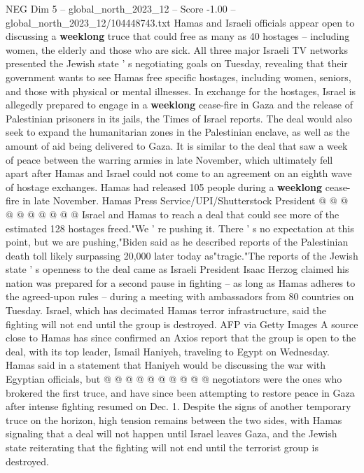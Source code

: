 \begin{textsample}{NEG Dim 5 – global\_north\_2023\_12 – Score -1.00 – global\_north\_2023\_12/104448743.txt}  \label{ex:f5_neg_053}
Hamas and Israeli officials appear open to discussing a \textbf{weeklong} truce that could free as many as 40 hostages -- including women, the elderly and those who are sick.
All three major Israeli TV networks presented the Jewish state ' s negotiating goals on Tuesday, revealing that their government wants to see Hamas free specific hostages, including women, seniors, and those with physical or mental illnesses.
In exchange for the hostages, Israel is allegedly prepared to engage in a \textbf{weeklong} cease-fire in Gaza and the release of Palestinian prisoners in its jails, the Times of Israel reports.
The deal would also seek to expand the humanitarian zones in the Palestinian enclave, as well as the amount of aid being delivered to Gaza.
It is similar to the deal that saw a week of peace between the warring armies in late November, which ultimately fell apart after Hamas and Israel could not come to an agreement on an eighth wave of hostage exchanges.
Hamas had released 105 people during a \textbf{weeklong} cease-fire in late November.
Hamas Press Service/UPI/Shutterstock President @ @ @ @ @ @ @ @ @ @ Israel and Hamas to reach a deal that could see more of the estimated 128 hostages freed."We ' re pushing it.
There ' s no expectation at this point, but we are pushing,"Biden said as he described reports of the Palestinian death toll likely surpassing 20,000 later today as"tragic."The reports of the Jewish state ' s openness to the deal came as Israeli President Isaac Herzog claimed his nation was prepared for a second pause in fighting -- as long as Hamas adheres to the agreed-upon rules -- during a meeting with ambassadors from 80 countries on Tuesday.
Israel, which has decimated Hamas terror infrastructure, said the fighting will not end until the group is destroyed.
AFP via Getty Images A source close to Hamas has since confirmed an Axios report that the group is open to the deal, with its top leader, Ismail Haniyeh, traveling to Egypt on Wednesday.
Hamas said in a statement that Haniyeh would be discussing the war with Egyptian officials, but @ @ @ @ @ @ @ @ @ @ negotiators were the ones who brokered the first truce, and have since been attempting to restore peace in Gaza after intense fighting resumed on Dec. 1.
Despite the signs of another temporary truce on the horizon, high tension remains between the two sides, with Hamas signaling that a deal will not happen until Israel leaves Gaza, and the Jewish state reiterating that the fighting will not end until the terrorist group is destroyed.

\end{textsample}
